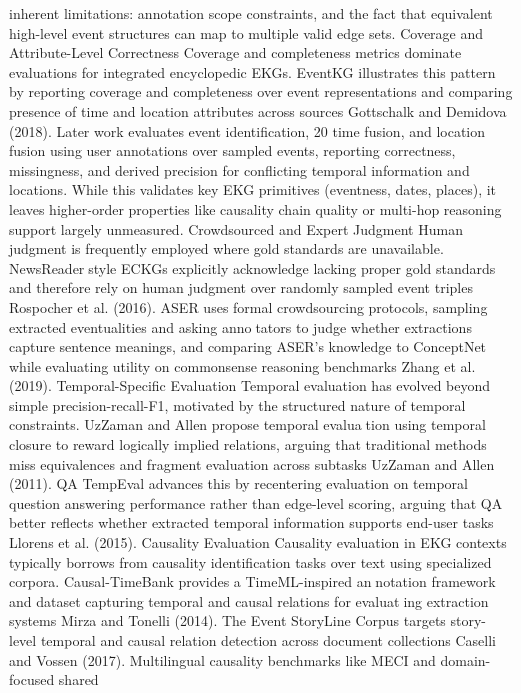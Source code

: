inherent limitations: annotation scope constraints, and the fact that equivalent high-level
event structures can map to multiple valid edge sets.
Coverage and Attribute-Level Correctness
Coverage and completeness metrics dominate evaluations for integrated encyclopedic
EKGs. EventKG illustrates this pattern by reporting coverage and completeness over
event representations and comparing presence of time and location attributes across
sources Gottschalk and Demidova (2018). Later work evaluates event identification,
20
time fusion, and location fusion using user annotations over sampled events, reporting
correctness, missingness, and derived precision for conflicting temporal information and
locations. While this validates key EKG primitives (eventness, dates, places), it leaves
higher-order properties like causality chain quality or multi-hop reasoning support largely
unmeasured.
Crowdsourced and Expert Judgment
Human judgment is frequently employed where gold standards are unavailable. NewsReaderstyle ECKGs explicitly acknowledge lacking proper gold standards and therefore rely on
human judgment over randomly sampled event triples Rospocher et al. (2016). ASER
uses formal crowdsourcing protocols, sampling extracted eventualities and asking annotators to judge whether extractions capture sentence meanings, and comparing ASER’s
knowledge to ConceptNet while evaluating utility on commonsense reasoning benchmarks
Zhang et al. (2019).
Temporal-Specific Evaluation
Temporal evaluation has evolved beyond simple precision-recall-F1, motivated by the
structured nature of temporal constraints. UzZaman and Allen propose temporal evaluation using temporal closure to reward logically implied relations, arguing that traditional
methods miss equivalences and fragment evaluation across subtasks UzZaman and Allen
(2011). QA TempEval advances this by recentering evaluation on temporal question
answering performance rather than edge-level scoring, arguing that QA better reflects
whether extracted temporal information supports end-user tasks Llorens et al. (2015).
Causality Evaluation
Causality evaluation in EKG contexts typically borrows from causality identification tasks
over text using specialized corpora. Causal-TimeBank provides a TimeML-inspired annotation framework and dataset capturing temporal and causal relations for evaluating extraction systems Mirza and Tonelli (2014). The Event StoryLine Corpus targets
story-level temporal and causal relation detection across document collections Caselli and
Vossen (2017). Multilingual causality benchmarks like MECI and domain-focused shared

